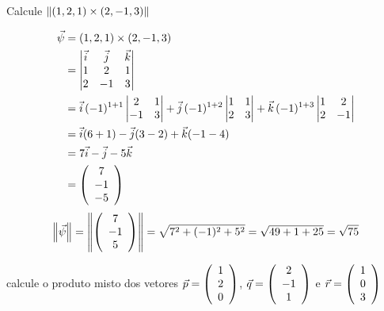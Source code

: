 \documentclass[a4paper,12pt,fleqn]{article}
\begin{document}
Calcule
\(
  \norm{(1,  2, 1) \times (2, -1, 3)}
\)
\begin{answer}
  \begin{align*}
    \vec{\psi}
    & = (1,  2, 1) \times (2, -1, 3) \\
    & = \begin{vmatrix}
          \vec{i} & \vec{j} & \vec{k} \\
          1        & 2        & 1       \\
          2        & -1       & 3
        \end{vmatrix}
    \\
    & = \vec{i}\, (-1)^{1+1}
        \begin{vmatrix}
          2 & 1 \\
          -1 & 3
        \end{vmatrix}
      + \vec{j}\, (-1)^{1+2}
        \begin{vmatrix}
          1 & 1 \\
          2 & 3
        \end{vmatrix}
      + \vec{k}\, (-1)^{1+3}
        \begin{vmatrix}
          1 & 2 \\
          2 & -1
        \end{vmatrix}
    \\
    & = \vec{i} (6 + 1)
      - \vec{j} (3 - 2)
      + \vec{k} (-1 -4) \\
    & = 7\vec{i} - \vec{j} -5\vec{k} \\
    & = \left(\begin{array}{c} 7 \\ -1 \\ -5 \end{array}\right)
  \end{align*}
  \[
    \norm{\vec{\psi}}
    = \norm{\vetortri{7}{-1}{5}}
    = \sqrt{7^2 + (-1)^2 + 5^2}
    = \sqrt{49 + 1 + 25}
    = \sqrt{75}
  \]
\end{answer}

calcule o produto misto dos vetores
\(
  \vec{p} = \left(\begin{array}{c} 1 \\ 2 \\ 0 \end{array}\right)
\),
\(
  \vec{q} = \left(\begin{array}{c} 2 \\ -1 \\ 1 \end{array}\right)
\) e
\(
  \vec{r} = \left(\begin{array}{c} 1 \\ 0 \\ 3 \end{array}\right)
\)
\end{document}
